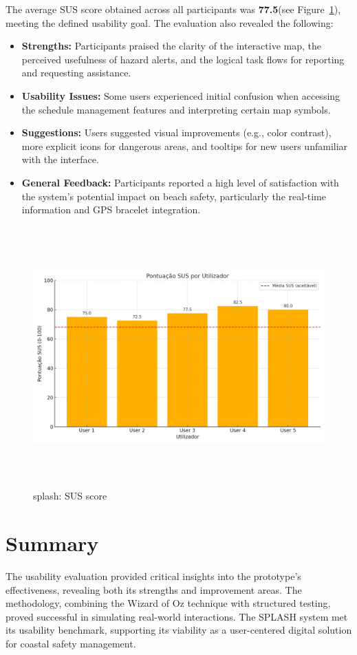 The average SUS  score obtained across all participants was \textbf{77.5}(see Figure~\ref{fig:sus_score}), meeting the defined usability goal. The evaluation also revealed the following:

\begin{itemize}
    \item \textbf{Strengths:} Participants praised the clarity of the interactive map, the perceived usefulness of hazard alerts, and the logical task flows for reporting and requesting assistance.

    \item \textbf{Usability Issues:} Some users experienced initial confusion when accessing the schedule management features and interpreting certain map symbols.

    \item \textbf{Suggestions:} Users suggested visual improvements (e.g., color contrast), more explicit icons for dangerous areas, and tooltips for new users unfamiliar with the interface.

    \item \textbf{General Feedback:} Participants reported a high level of satisfaction with the system's potential impact on beach safety, particularly the real-time information and GPS bracelet integration.
\end{itemize}
\begin{figure}[H]
    \centering
    \includegraphics[width=13cm,height=10cm]{figs/SUS_Poster_Grafico.png}
    \caption{\ac{splash}: SUS score}
    \label{fig:sus_score}
\end{figure}
\section{Summary}
The usability evaluation provided critical insights into the prototype’s effectiveness, revealing both its strengths and improvement areas. The methodology, combining the Wizard of Oz technique with structured testing, proved successful in simulating real-world interactions. The SPLASH system met its usability benchmark, supporting its viability as a user-centered digital solution for coastal safety management.

